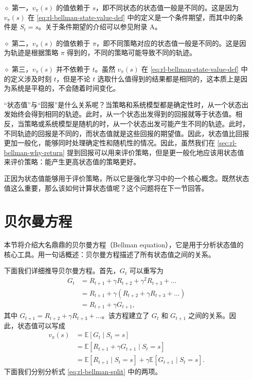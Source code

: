 \medskip
$\diamond$ 第一，$v_\pi(s)$ 的值依赖于 $s$，即不同状态的状态值一般是不同的。这是因为 $v_\pi(s)$ 在 \cref{eq:rl-bellman-state-value-def} 中的定义是一个条件期望，而其中的条件是 $S_t = s$。关于条件期望的介绍可以参见附录 A。

\medskip
$\diamond$ 第二，$v_\pi(s)$ 的值依赖于 $\pi$，即不同策略对应的状态值一般是不同的。这是因为轨迹是根据策略 $\pi$ 得到的，不同的策略可能导致不同的轨迹。

\medskip
$\diamond$ 第三，$v_\pi(s)$ 并不依赖于 $t$。虽然 $v_\pi(s)$ 在 \cref{eq:rl-bellman-state-value-def} 中的定义涉及时刻 $t$，但是不论 $t$ 选取什么值得到的结果都是相同的，这本质上是因为系统是平稳的，不会随着时间变化。

“状态值”与“回报”是什么关系呢？当策略和系统模型都是确定性时，从一个状态出发始终会得到相同的轨迹。此时，从一个状态出发得到的回报就等于状态值。相反，当策略或系统模型是随机的时，从一个状态出发可能产生不同的轨迹。此时，不同轨迹的回报是不同的，而状态值就是这些回报的期望值。因此，状态值比回报更加一般化，能够同时处理确定性和随机性的情况。因此，虽然我们在 \cref{sec:rl-bellman-why-return} 提到回报可以用来评价策略，但是更一般化地应该用状态值来评价策略：能产生更高状态值的策略更好。

正因为状态值能够用于评价策略，所以它是强化学习中的一个核心概念。既然状态值这么重要，那么该如何计算状态值呢？这个问题将在下一节回答。

\section{贝尔曼方程}
\label{sec:rl-bellman-equation}

本节将介绍大名鼎鼎的贝尔曼方程（Bellman equation），它是用于分析状态值的核心工具。用一句话概述：贝尔曼方程描述了所有状态值之间的关系。

下面我们详细推导贝尔曼方程。首先，$G_t$ 可以重写为
\begin{equation*}
\begin{aligned}
G_t &= R_{t+1} + \gamma R_{t+2} + \gamma^2 R_{t+3} + \dots \\
&= R_{t+1} + \gamma (R_{t+2} + \gamma R_{t+3} + \dots) \\
&= R_{t+1} + \gamma G_{t+1},
\end{aligned}
\end{equation*}
其中 $G_{t+1} = R_{t+2} + \gamma R_{t+3} + \ldots$。该方程建立了 $G_t$ 和 $G_{t+1}$ 之间的关系。因此，状态值可以写成
\begin{equation}
\begin{aligned}
v_\pi(s) &= \mathbb{E}[G_t \mid S_t = s] \\
&= \mathbb{E}[R_{t+1} + \gamma G_{t+1} \mid S_t = s] \\
&= \mathbb{E}[R_{t+1} \mid S_t = s] + \gamma \mathbb{E}[G_{t+1} \mid S_t = s].
\end{aligned}
\label{eq:rl-bellman-split}
\end{equation}
下面我们分别分析式 \cref{eq:rl-bellman-split} 中的两项。

